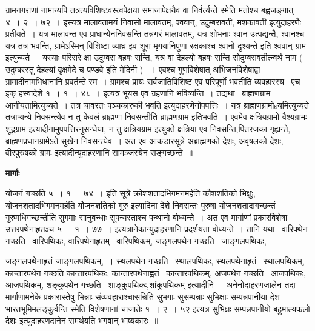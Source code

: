 \documentclass[11pt, openany]{book}
\begin{document}
ग्रामनगराणां नामान्यपि तत्रत्यविशिष्टवस्त्वपेक्षया समाजापेक्षयैव वा निर्वर्त्यन्ते स्मेति मतोश्च बह्वजङ्गात् ४~। २~। ७२~। इस्यत्र {\qt मालावतामयं निवासो मालावतम्, श्ववान्, उदुम्बरावती, मशकावती} इत्युदाहरणैः प्रतीयते~। यत्र मालावन्त एव प्राधान्येननिवसन्ति तन्नगरं मालावतम्, यत्र शोभनाः श्वान उत्पद्यन्तै, श्वानश्च यत्र तत्र भवन्ति, ग्रामेऽस्मिन् विशिष्टा व्याघ्र इव शूरा मृगयानिपुणा रक्षकाश्च श्वानो दृश्यन्ते इति श्ववान् ग्राम इत्युच्यते~। यस्याः परिसरे क्षा उदुम्बरा बहवः सन्ति, यत्र वा देहल्यो बहवः सन्ति सोदुम्बरावतीत्न्वर्थ नाम ( उदुम्बरस्तु देहल्यां वृक्षमेदे च पण्डवे इति मेदिनी ) ~। एवश्च गुणविशेषात् अभिजनविशेषाद्वा ग्रामादीनामभिधानानि प्रवर्तन्ते स्म~। ग्रामश्च प्रायः सर्वजातिविशिष्ट एव परिपूर्णो भवतीति व्यवहारस्य \textendash\ एच इक् हस्वादेशे १~। १~। ४८~। इत्यत्र भूयस एव ग्रहणानि भविष्यन्ति~। तद्यथा \textendash\ ब्राह्मणग्राम आनीयतामित्युच्यते~। तत्र चावरतः पञ्चकारुकी भवति इत्युदाहरणेनोपपत्तिः~। यत्र ब्राह्मणग्रामोsयमित्युच्यते तत्राप्यन्ये निवसन्त्येव न तु केवलं ब्राह्मणा निवसन्तीति ब्राह्मणग्राम इतिभवति~। एवमेव क्षत्रियग्रामो वैश्यग्रामः शूद्रग्राम इत्यादीनामुपपत्तिरनुसन्धेया, न तु क्षत्रियग्राम इत्युक्ते क्षत्रिया एव निवसन्ति,पितरजका गृह्यन्ते, ब्राह्मणप्रधानग्रामेऽते सुखेन निवसन्त्येव~। अत एव आकडारसूत्रे अब्राह्मणको देशः, अवृषलको देशः, वीरपुरुषको ग्रामः इत्यादीन्युदाहरणानि सामञ्जस्येन सङ्गच्छन्ते~॥

\begin{center}
\textbf{\Large मार्गाः \textendash\ }
\end{center}

योजनं गच्छति ५~। १~। ७४~। इति सूत्रे {\qt क्रोशशतादभिगमनमर्हति कौशशतिको भिक्षुः, योजनशतादभिगमनमर्हति यौजनशतिको गुरु} इत्यादिना देशे निवसन्तः पुरुषा योजनशतादागच्छन्तं गुरुमधिगच्छन्तीति सुगमाः सानुबन्धाः सूपन्यस्ताश्च पन्थानो बोध्यन्ते~। अत एव मार्गाणां प्रकारविशेषा उत्तरपथेनाहृतञ्च ५~। १~। ७७~। इत्यत्रानेकान्युदाहरणानि प्रदर्शयता बोध्यन्ते~। तानि यथा \textendash\ वारिपथेन गच्छति \textendash\ वारिपथिकः, वारिपथेनाहृतम् \textendash\ वारिपथिकम्, जङ्गलपथेन गच्छति \textendash\ जाङ्गलपथिकः,

\newpage

\noindent
जङ्गलपथेनाहृतं जाङ्गलपथिकम्,~। स्थलपथेन गच्छति \textendash\ स्थालपथिकः, स्थलपथेनाहृतं \textendash\ स्थालपथिकम्, कान्तारपथेन गच्छति कान्तारपथिकः, कान्तारपथेनाह्वतं \textendash\ कान्तारपथिकम्, अजपथेन गच्छति \textendash\ आजपथिकः, आजपथिकम्, शङ्कुपथेन गच्छति \textendash\ शाङ्कुपथिकः,शांकुपथिकम् इत्यादीनि~। अनेनोदाहरणजालेन तदा मार्गाणामनेके प्रकारास्तेषु भिन्नाः संव्यवहाराश्चासन्निति सुभगाः सुसम्पन्नाः सुभिक्षाः सम्पन्नपानीया देश भारतभूमिमलङ्कुर्वन्ति स्मेति विशेषणानां चाजातेः १~। २~। ५२ इत्यत्र {\qt सुभिक्षः सम्पन्नपानीयो बहुमाल्यफलो देशः} इत्युदाहरणदानेन समर्थयति भगवान् भाष्यकारः~॥
\end{document}
